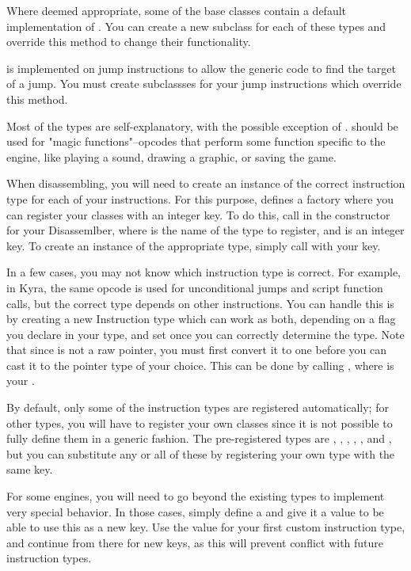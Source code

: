 Where deemed appropriate, some of the base classes contain a default implementation of . You can create a new subclass for each of these types and override this method to change their functionality.

 is implemented on jump instructions to allow the generic code to find the target of a jump. You must create subclassses for your jump instructions which override this method.

Most of the types are self-explanatory, with the possible exception of .  should be used for "magic functions"--opcodes that perform some function specific to the engine, like playing a sound, drawing a graphic, or saving the game.

When disassembling, you will need to create an instance of the correct instruction type for each of your instructions. For this purpose,  defines a factory  where you can register your classes with an integer key. To do this, call  in the constructor for your Disassemlber, where  is the name of the type to register, and  is an integer key. To create an instance of the appropriate type, simply call  with your key.

In a few cases, you may not know which instruction type is correct. For example, in Kyra, the same opcode is used for unconditional jumps and script function calls, but the correct type depends on other instructions. You can handle this is by creating a new Instruction type which can work as both, depending on a flag you declare in your type, and set once you can correctly determine the type. Note that since  is not a raw pointer, you must first convert it to one before you can cast it to the pointer type of your choice. This can be done by calling , where  is your .

By default, only some of the instruction types are registered automatically; for other types, you will have to register your own classes since it is not possible to fully define them in a generic fashion. The pre-registered types are , , , , ,  and , but you can substitute any or all of these by registering your own type with the same key.

For some engines, you will need to go beyond the existing types to implement very special behavior. In those cases, simply define a  and give it a value to be able to use this as a new key. Use the value  for your first custom instruction type, and continue from there for new keys, as this will prevent conflict with future instruction types.

